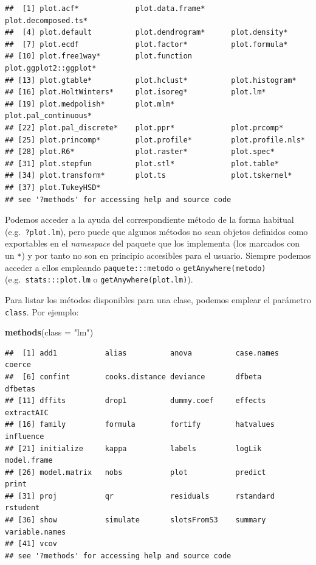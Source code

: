 \documentclass[
]{book}
\newenvironment{Shaded}{\begin{snugshade}}{\end{snugshade}}
\newcommand{\AttributeTok}[1]{\textcolor[rgb]{0.13,0.29,0.53}{#1}}
\newcommand{\FunctionTok}[1]{\textcolor[rgb]{0.13,0.29,0.53}{\textbf{#1}}}
\newcommand{\NormalTok}[1]{#1}
\newcommand{\StringTok}[1]{\textcolor[rgb]{0.31,0.60,0.02}{#1}}
\theoremstyle{break}
\theoremstyle{nonumberplain}
\begin{document}
\begin{verbatim}
##  [1] plot.acf*             plot.data.frame*      plot.decomposed.ts*  
##  [4] plot.default          plot.dendrogram*      plot.density*        
##  [7] plot.ecdf             plot.factor*          plot.formula*        
## [10] plot.free1way*        plot.function         plot.ggplot2::ggplot*
## [13] plot.gtable*          plot.hclust*          plot.histogram*      
## [16] plot.HoltWinters*     plot.isoreg*          plot.lm*             
## [19] plot.medpolish*       plot.mlm*             plot.pal_continuous* 
## [22] plot.pal_discrete*    plot.ppr*             plot.prcomp*         
## [25] plot.princomp*        plot.profile*         plot.profile.nls*    
## [28] plot.R6*              plot.raster*          plot.spec*           
## [31] plot.stepfun          plot.stl*             plot.table*          
## [34] plot.transform*       plot.ts               plot.tskernel*       
## [37] plot.TukeyHSD*       
## see '?methods' for accessing help and source code
\end{verbatim}

Podemos acceder a la ayuda del correspondiente método de la forma habitual (e.g.~\texttt{?plot.lm}), pero puede que algunos métodos no sean objetos definidos como exportables en el \emph{namespace} del paquete que los implementa (los marcados con un \texttt{*}) y por tanto no son en principio accesibles para el usuario.
Siempre podemos acceder a ellos empleando \texttt{paquete:::metodo} o \texttt{getAnywhere(metodo)} (e.g.~\texttt{stats:::plot.lm} o \texttt{getAnywhere(plot.lm)}).

Para listar los métodos disponibles para una clase, podemos emplear el parámetro \texttt{class}.
Por ejemplo:

\begin{Shaded}
\begin{Highlighting}[]
\FunctionTok{methods}\NormalTok{(}\AttributeTok{class =} \StringTok{"lm"}\NormalTok{)}
\end{Highlighting}
\end{Shaded}

\begin{verbatim}
##  [1] add1           alias          anova          case.names     coerce        
##  [6] confint        cooks.distance deviance       dfbeta         dfbetas       
## [11] dffits         drop1          dummy.coef     effects        extractAIC    
## [16] family         formula        fortify        hatvalues      influence     
## [21] initialize     kappa          labels         logLik         model.frame   
## [26] model.matrix   nobs           plot           predict        print         
## [31] proj           qr             residuals      rstandard      rstudent      
## [36] show           simulate       slotsFromS3    summary        variable.names
## [41] vcov          
## see '?methods' for accessing help and source code
\end{verbatim}
\end{document}

